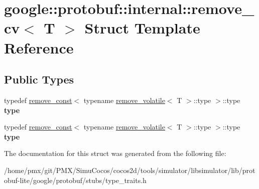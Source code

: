 \hypertarget{structgoogle_1_1protobuf_1_1internal_1_1remove__cv}{}\section{google\+:\+:protobuf\+:\+:internal\+:\+:remove\+\_\+cv$<$ T $>$ Struct Template Reference}
\label{structgoogle_1_1protobuf_1_1internal_1_1remove__cv}
\subsection*{Public Types}
\begin{DoxyCompactItemize}
\item 
\mbox{\label{structgoogle_1_1protobuf_1_1internal_1_1remove__cv_a52812414c93a7ef3a4e4af42aee8de27}} 
typedef \hyperlink{structgoogle_1_1protobuf_1_1internal_1_1remove__const}{remove\+\_\+const}$<$ typename \hyperlink{structgoogle_1_1protobuf_1_1internal_1_1remove__volatile}{remove\+\_\+volatile}$<$ T $>$\+::type $>$\+::type {\bfseries type}
\item 
\mbox{\label{structgoogle_1_1protobuf_1_1internal_1_1remove__cv_a52812414c93a7ef3a4e4af42aee8de27}} 
typedef \hyperlink{structgoogle_1_1protobuf_1_1internal_1_1remove__const}{remove\+\_\+const}$<$ typename \hyperlink{structgoogle_1_1protobuf_1_1internal_1_1remove__volatile}{remove\+\_\+volatile}$<$ T $>$\+::type $>$\+::type {\bfseries type}
\end{DoxyCompactItemize}


The documentation for this struct was generated from the following file\+:\begin{DoxyCompactItemize}
\item 
/home/pmx/git/\+P\+M\+X/\+Simu\+Cocos/cocos2d/tools/simulator/libsimulator/lib/protobuf-\/lite/google/protobuf/stubs/type\+\_\+traits.\+h\end{DoxyCompactItemize}

